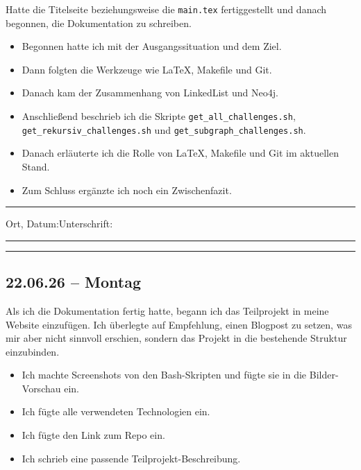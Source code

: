 {Hatte die Titelseite beziehungsweise die \texttt{main.tex} fertiggestellt und danach begonnen, die Dokumentation zu schreiben.

\begin{itemize}
    \item Begonnen hatte ich mit der Ausgangssituation und dem Ziel.
    \item Dann folgten die Werkzeuge wie \LaTeX, Makefile und Git.
    \item Danach kam der Zusammenhang von LinkedList und Neo4j.
    \item Anschließend beschrieb ich die Skripte \texttt{get\_all\_challenges.sh},
     \texttt{get\_rekursiv\_challenges.sh} und \texttt{get\_subgraph\_challenges.sh}.
    \item Danach erläuterte ich die Rolle von \LaTeX, Makefile und Git im aktuellen Stand.
    \item Zum Schluss ergänzte ich noch ein Zwischenfazit.
\end{itemize}
}

\vfill
\noindent\rule{\linewidth}{0.2pt}

\noindent Ort, Datum:\hfill Unterschrift:\\[0.5cm]
\noindent \rule{6cm}{0.9pt}\hfill \rule{6cm}{0.9pt}

\restoregeometry
\newpage


\vspace*{-2cm}

\subsection{22.06.26 -- Montag}

Als ich die Dokumentation fertig hatte, begann ich das Teilprojekt in meine Website einzufügen.
Ich überlegte auf Empfehlung, einen Blogpost zu setzen, was mir aber nicht sinnvoll erschien, sondern das Projekt in die bestehende Struktur einzubinden.

\begin{itemize}
    \item Ich machte Screenshots von den Bash-Skripten und fügte sie in die Bilder-Vorschau ein.
    \item Ich fügte alle verwendeten Technologien ein.
    \item Ich fügte den Link zum Repo ein.
    \item Ich schrieb eine passende Teilprojekt-Beschreibung.
\end{itemize}

